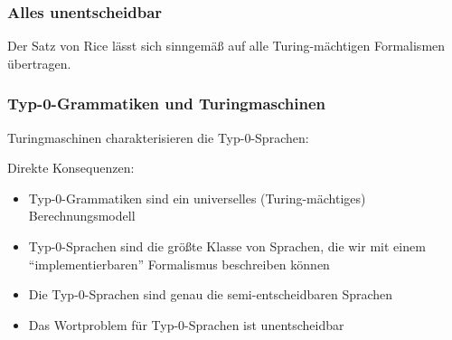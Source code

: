 \documentclass[aspectratio=1610,onlymath]{beamer}
\begin{document}
\begin{frame}\frametitle{Alles unentscheidbar}


Der Satz von Rice lässt sich sinngemäß auf alle Turing-mächtigen Formalismen übertragen.

\end{frame}


\begin{frame}\frametitle{Typ-0-Grammatiken und Turingmaschinen}

Turingmaschinen charakterisieren die Typ-0-Sprachen:\medskip

\medskip\pause

\alert{Direkte Konsequenzen:}
\begin{itemize}
\item Typ-0-Grammatiken sind ein universelles (Turing-mächtiges) Berechnungsmodell
\item Typ-0-Sprachen sind die größte Klasse von Sprachen, die wir mit einem "`implementierbaren"' Formalismus beschreiben können
\item Die Typ-0-Sprachen sind genau die semi-entscheidbaren Sprachen
\item Das Wortproblem für Typ-0-Sprachen ist unentscheidbar
\end{itemize}

\end{frame}
\end{document}
